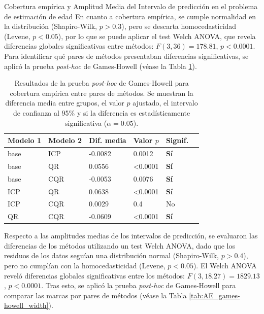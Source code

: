 \begin{StatisticsRef}{Cobertura empírica y Amplitud Media del Intervalo de predicción en el problema de estimación de edad}
%
En cuanto a cobertura empírica, se cumple normalidad en la distribución (Shapiro-Wilk, $p>0.3$), pero se descarta homocedasticidad (Levene, $p<0.05$), por lo que se puede aplicar el test Welch ANOVA, que revela diferencias globales significativas entre métodos: $F(3,36)=178.81$, $p<0.0001$. Para identificar qué pares de métodos presentaban diferencias significativas, se aplicó la prueba \textit{post-hoc} de Games-Howell (véase la Tabla \ref{tab:AE_games-howell_EC}).
%
\renewcommand{\arraystretch}{1.2}
\begin{table}[H]
    \small
    \centering
    \begin{tabular}{llllll}
    \toprule
    \textbf{Modelo 1} & \textbf{Modelo 2} & \textbf{Dif. media} & \textbf{Valor $p$} & \textbf{Signif.} \\ \hline
    base & ICP & -0.0082 & 0.0012 & \textbf{Sí} \\
    base & QR & 0.0556 & \textless 0.0001 & \textbf{Sí} \\
    base & CQR & -0.0053 & 0.0076 & \textbf{Sí} \\
    ICP & QR & 0.0638 & \textless 0.0001 & \textbf{Sí} \\
    ICP & CQR & 0.0029 & 0.4 & No \\
    QR & CQR & -0.0609 & \textless 0.0001 & \textbf{Sí} \\
    \bottomrule
    \end{tabular}
    \caption[
        Problema de estimación de edad: 
        Resultados de la prueba \textit{post-hoc} de Games-Howell para cobertura empírica entre pares de métodos.
    ]{
        Resultados de la prueba \textit{post-hoc} de Games-Howell para cobertura empírica entre pares de métodos. 
        Se muestran la diferencia media entre grupos, el valor $p$ ajustado, el intervalo de confianza al 95\% y si la diferencia es estadísticamente significativa ($\alpha = 0.05$).
    }
    \label{tab:AE_games-howell_EC}
\end{table}
%
Respecto a las amplitudes medias de los intervalos de predicción, se evaluaron las diferencias de los métodos utilizando un test Welch ANOVA, dado que los residuos de los datos seguían una distribución normal (Shapiro-Wilk, $p>0.4$), pero no cumplían con la homocedasticidad (Levene, $p<0.05$). El Welch ANOVA reveló diferencias globales significativas entre los métodos: $F(3, 18.27) = 1829.13$, $p < 0.0001$. Tras esto, se aplicó la prueba \textit{post-hoc} de Games-Howell para comparar las marcas por pares de métodos (véase la Tabla \ref{tab:AE_games-howell_width}).

\end{StatisticsRef}
